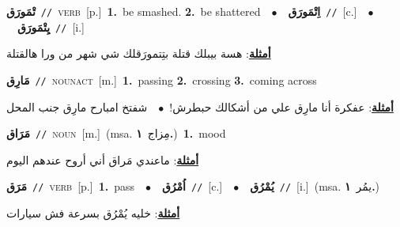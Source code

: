 \documentclass[10pt,a4paper,twoside]{article} %
\begin{document}
\begin{multicols}{2}
{\setlength\topsep{0pt}\textbf{\foreignlanguage{arabic}{تْمَورَق}}\ {\color{gray}\texttt{//}\color{black}}\ \textsc{verb}\ [p.]\ \textbf{1.}~be smashed.  \textbf{2.}~be shattered\ \ $\bullet$\ \ \setlength\topsep{0pt}\textbf{\foreignlanguage{arabic}{اِتْمَورَق}}\ {\color{gray}\texttt{//}\color{black}}\ [c.]\ \ $\bullet$\ \ \setlength\topsep{0pt}\textbf{\foreignlanguage{arabic}{يِتْمَورَق}}\ {\color{gray}\texttt{//}\color{black}}\ [i.]\  \begin{flushright}\color{gray}\foreignlanguage{arabic}{\textbf{\underline{\foreignlanguage{arabic}{أمثلة}}}: هسة بيبلك قتلة بتِتمورَقلك شي شهر من ورا هالقتلة}\end{flushright}\color{black}} \vspace{2mm}

{\setlength\topsep{0pt}\textbf{\foreignlanguage{arabic}{مَارِق}}\ {\color{gray}\texttt{//}\color{black}}\ \textsc{noun\textunderscore act}\ [m.]\ \textbf{1.}~passing  \textbf{2.}~crossing  \textbf{3.}~coming across\  \begin{flushright}\color{gray}\foreignlanguage{arabic}{\textbf{\underline{\foreignlanguage{arabic}{أمثلة}}}: عفكرة أنا مارِق علي من أشكالك حبطرش!\ $\bullet$\ \  شفتخ امبارح مارِق جنب المحل}\end{flushright}\color{black}} \vspace{2mm}

{\setlength\topsep{0pt}\textbf{\foreignlanguage{arabic}{مَرَاق}}\ {\color{gray}\texttt{//}\color{black}}\ \textsc{noun}\ [m.]\ \color{gray}(msa. \foreignlanguage{arabic}{مِزاج}~\foreignlanguage{arabic}{\textbf{١.}})\color{black}\ \textbf{1.}~mood\  \begin{flushright}\color{gray}\foreignlanguage{arabic}{\textbf{\underline{\foreignlanguage{arabic}{أمثلة}}}: ماعندي مَراق أني أروح عندهم اليوم}\end{flushright}\color{black}} \vspace{2mm}

{\setlength\topsep{0pt}\textbf{\foreignlanguage{arabic}{مَرَق}}\ {\color{gray}\texttt{//}\color{black}}\ \textsc{verb}\ [p.]\ \textbf{1.}~pass\ \ $\bullet$\ \ \setlength\topsep{0pt}\textbf{\foreignlanguage{arabic}{اُمْرُق}}\ {\color{gray}\texttt{//}\color{black}}\ [c.]\ \ $\bullet$\ \ \setlength\topsep{0pt}\textbf{\foreignlanguage{arabic}{يُمْرُق}}\ {\color{gray}\texttt{//}\color{black}}\ [i.]\ \color{gray}(msa. \foreignlanguage{arabic}{يمُر}~\foreignlanguage{arabic}{\textbf{١.}})\color{black}\  \begin{flushright}\color{gray}\foreignlanguage{arabic}{\textbf{\underline{\foreignlanguage{arabic}{أمثلة}}}: خليه يُمْرُق بسرعة فش سيارات}\end{flushright}\color{black}} \vspace{2mm}


\end{multicols}
\end{document}
